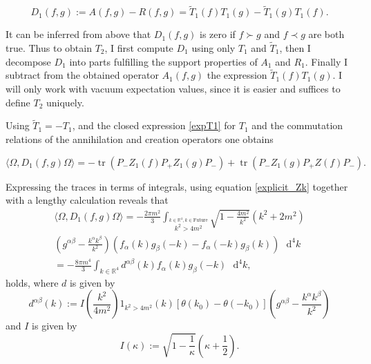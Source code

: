\documentclass[b5paper,draft,openbib,12pt]{memoir}
\DeclareMathOperator{\tr}{tr}
\begin{document}
\begin{equation}\label{defD_1}
D_1(f,g):=A(f,g)-R(f,g)=\tilde{T}_1 (f) T_1(g)-\tilde{T}_1 (g) T_1(f) .
\end{equation}

It can be inferred from above that \(D_1(f,g)\) is zero if \(f\succ g\) and \(f\prec g\) are both true. Thus to obtain \(T_2\), I first compute \(D_1\) using only \(T_1\) and \(\tilde{T}_1\), then I decompose \(D_1\) into parts fulfilling the support properties of \(A_1\) and \(R_1\). Finally I subtract from the obtained operator \(A_1 (f,g)\) the expression \(\tilde{T}_1(f)T_1(g)\). I will only work with vacuum expectation values, since it is easier and suffices to define \(T_2\) uniquely.

Using \(\tilde{T}_1=-T_1\), and the closed expression \eqref{expT1} for \(T_1\) and the commutation relations of the annihilation and creation operators one obtains

\begin{equation}
\langle \Omega, D_1(f,g) \Omega \rangle= - \tr \left( P_- Z_1(f)P_+ Z_1(g)P_- \right)+  \tr \left(P_- Z_1(g) P_+ Z(f)P_- \right).
\end{equation}


Expressing the traces in terms of integrals, using equation \eqref{explicit_Zk} together with a lengthy calculation reveals that 
\begin{multline}\label{D1_vacc}
\langle \Omega, D_1(f,g) \Omega \rangle
=-\frac{2\pi m^2}{3} \int_{\stackrel{k\in\mathbb{R}^4, k\in\text{Future}}{k^2>4m^2}} \sqrt{1-\frac{4m^2}{k^2}}(k^2+2m^2) \\
(g^{\alpha \beta}-\frac{k^\alpha k^\beta}{k^2})\left(f_\alpha (k) g_\beta (-k) - f_\alpha (-k) g_\beta (k)\right) \text{ }\mathrm{d}^4k\\
=-\frac{8 \pi m^4}{3} \int_{k\in\mathbb{R}^4}  d^{\alpha \beta}(k) f_\alpha(k) g_\beta (-k)\text{ }\mathrm{d}^4k,
\end{multline}
holds, where \(d\) is given by
\begin{equation}
d^{\alpha \beta}(k):= I\left( \frac{k^2}{4m^2}\right) 1_{k^2>4m^2}(k) [\theta (k_0)- \theta (-k_0)] \left(g^{\alpha \beta}-\frac{k^\alpha k^\beta}{k^2}\right)
\end{equation}
and \(I\) is given by
\begin{equation}
I(\kappa):=\sqrt{1-\frac{1}{\kappa}}\left(\kappa +\frac{1}{2}\right).
\end{equation}
\end{document}

